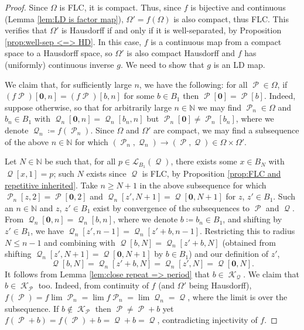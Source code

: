 \documentclass[11pt]{amsart}
\numberwithin{equation}{section}
\theoremstyle{plain}
\theoremstyle{definition}
\newcommand{\N}{\mathbb N}
\DeclareMathOperator{\cP}{\mathcal{P}}
\DeclareMathOperator{\cQ}{\mathcal{Q}}
\DeclareMathOperator{\cK}{\mathcal{K}}
\newcommand{\lang}{\mathscr{L}}
\begin{document}
\begin{proof}
Since \(\Omega\) is FLC, it is compact. Thus, since \(f\) is bijective and continuous (Lemma \ref{lem:LD is factor map}), \(\Omega' = f(\Omega)\) is also compact, thus FLC. This verifies that \(\Omega'\) is Hausdorff if and only if it is well-separated, by Proposition \ref{prop:well-sep <=> HD}. In this case, \(f\) is a continuous map from a compact space to a Hausdorff space, so \(\Omega'\) is also compact Hausdorff and \(f\) has (uniformly) continuous inverse \(g\). We need to show that \(g\) is an LD map.

We claim that, for sufficiently large \(n\), we have the following: for all \(\cP \in \Omega\), if \((f\cP)[\mathbf{0},n] = (f\cP)[b,n]\) for some \(b \in B_1\) then \(\cP[\mathbf{0}] = \cP[b]\). Indeed, suppose otherwise, so that for arbitrarily large \(n \in \N\) we may find \(\cP_n \in \Omega\) and \(b_n \in B_1\) with \(\cQ_n[\mathbf{0},n] = \cQ_n[b_n,n]\) but \(\cP_n[\mathbf{0}] \neq \cP_n[b_n]\), where we denote \(\cQ_n \coloneqq f(\cP_n)\). Since \(\Omega\) and \(\Omega'\) are compact, we may find a subsequence of the above \(n \in \N\) for which \((\cP_n,\cQ_n) \to (\cP,\cQ) \in \Omega \times \Omega'\).

Let \(N \in \N\) be such that, for all \(p \in \lang_{B_1}(\cQ)\), there exists some \(x \in B_N\) with \(\cQ[x,1] = p\); such \(N\) exists since \(\cQ\) is FLC, by Proposition \ref{prop:FLC and repetitive inherited}. Take \(n \geq N+1\) in the above subsequence for which \(\cP_n[z,2] = \cP[\mathbf{0},2]\) and \(\cQ_n[z',N+1] = \cQ[\mathbf{0},N+1]\) for \(z\), \(z' \in B_1\). Such an \(n \in \N\) and \(z\), \(z' \in B_1\) exist by convergence of the subsequences to \(\cP\) and \(\cQ\). From \(\cQ_n[\mathbf{0},n] = \cQ_n[b,n]\), where we denote \(b \coloneqq b_n \in B_1\), and shifting by \(z' \in B_1\), we have \(\cQ_n[z',n-1] = \cQ_n[z'+b,n-1]\). Restricting this to radius \(N \leq n-1\) and combining with \(\cQ[b,N] = \cQ_n[z'+b,N]\) (obtained from shifting \(\cQ_n[z',N+1] = \cQ[\mathbf{0},N+1]\) by \(b \in B_1\)) and our definition of \(z'\),
\[
\cQ[b,N] = \cQ_n[z'+b,N] = \cQ_n[z',N] = \cQ[\mathbf{0},N] .
\]
It follows from Lemma \ref{lem:close repeat => period} that \(b \in \cK_{\cQ}\). We claim that \(b \in \cK_{\cP}\) too. Indeed, from continuity of \(f\) (and \(\Omega'\) being Hausdorff), \(f(\cP) = f \lim \cP_n = \lim f \cP_n = \lim \cQ_n = \cQ\), where the limit is over the subsequence. If \(b \notin \cK_{\cP}\) then \(\cP \neq \cP + b\) yet \(f(\cP + b) = f(\cP) + b = \cQ + b = \cQ\), contradicting injectivity of \(f\).


\end{proof}
\end{document}

